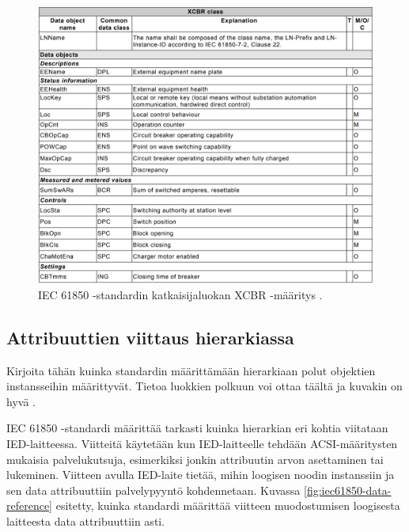 \begin{figure}
	\includegraphics[width=1\textwidth]{pictures/xcbr-class.png}
	\caption{IEC 61850 -standardin katkaisijaluokan XCBR -määritys \cite[s.~106]{IEC61850-7-4}.}
	\label{fig:xcbr-class}
\end{figure}


\subsection{Attribuuttien viittaus hierarkiassa}
\begin{it}
	Kirjoita tähän kuinka standardin määrittämään hierarkiaan polut objektien instansseihin määrittyvät. Tietoa luokkien polkuun voi ottaa täältä ja kuvakin on hyvä \cite[s.~93--95]{IEC61850-7-1}.
\end{it}

IEC 61850 -standardi määrittää tarkasti kuinka hierarkian eri kohtia viitataan IED-laitteessa. Viitteitä käytetään kun IED-laitteelle tehdään ACSI-määritysten mukaisia palvelukutsuja, esimerkiksi jonkin attribuutin arvon asettaminen tai lukeminen. Viitteen avulla IED-laite tietää, mihin loogisen noodin instanssiin ja sen data attribuuttiin palvelypyyntö kohdennetaan. Kuvassa \ref{fig:iec61850-data-reference} esitetty, kuinka standardi määrittää viitteen muodostumisen loogisesta laitteesta data attribuuttiin asti.


